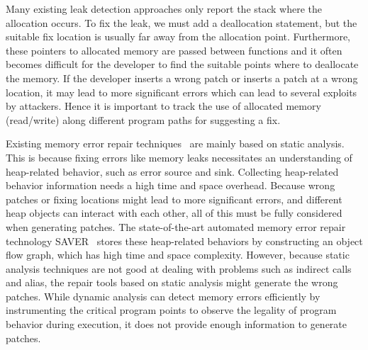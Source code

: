 \documentclass[a4paper,11pt,oneside,openany]{book}
\begin{document}
Many existing leak detection approaches only report the stack where the allocation occurs. To fix the leak, we must add a deallocation statement, but the suitable fix location is usually far away from the allocation point. Furthermore, these pointers to allocated memory are passed between functions and it often becomes difficult for the developer to find the suitable points where to deallocate the memory. If the developer inserts a wrong patch or inserts a patch at a wrong location, it may lead to more significant errors which can lead to several exploits by attackers. Hence it is important to track the use of allocated memory (read/write) along different program paths for suggesting a fix.

Existing memory error repair techniques~\cite{SAVER,Memfix} are mainly based on static analysis. This is because fixing errors like memory leaks necessitates an understanding of heap-related behavior, such as error source and sink. Collecting heap-related behavior information needs a high time and space overhead. Because wrong patches or fixing locations might lead to more significant errors, and different heap objects can interact with each other, all of this must be fully considered when generating patches. The state-of-the-art automated memory error repair technology SAVER~\cite{SAVER} stores these heap-related behaviors by constructing an object flow graph, which has high time and space complexity. However, because static analysis techniques are not good at dealing with problems such as indirect calls and alias, the repair tools based on static analysis might generate the wrong patches. While dynamic analysis can detect memory errors efficiently by instrumenting the critical program points to observe the legality of program behavior during execution, it does not provide enough information to generate patches.
\end{document}
